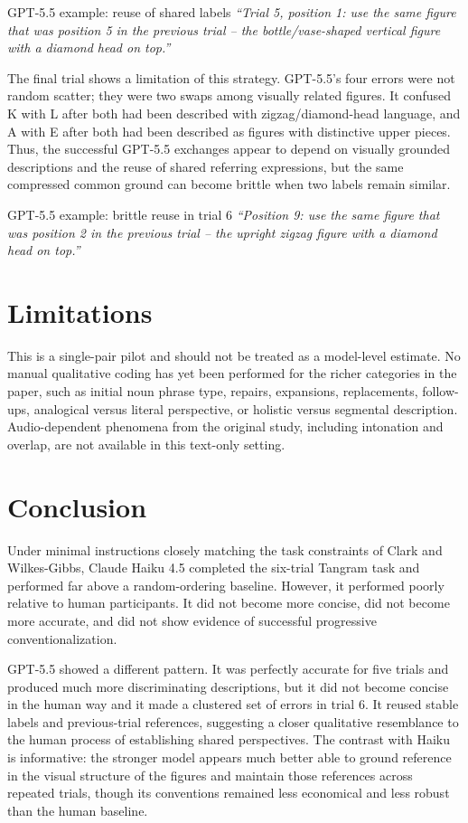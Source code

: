 \documentclass[11pt]{article}
\begin{document}
\begin{modelquote}{GPT-5.5 example: reuse of shared labels}
\emph{``Trial 5, position 1: use the same figure that was position 5 in the previous trial -- the bottle/vase-shaped vertical figure with a diamond head on top.''}
\end{modelquote}

The final trial shows a limitation of this strategy. GPT-5.5's four errors were not random scatter; they were two swaps among visually related figures. It confused K with L after both had been described with zigzag/diamond-head language, and A with E after both had been described as figures with distinctive upper pieces. Thus, the successful GPT-5.5 exchanges appear to depend on visually grounded descriptions and the reuse of shared referring expressions, but the same compressed common ground can become brittle when two labels remain similar.

\begin{modelquote}{GPT-5.5 example: brittle reuse in trial 6}
\emph{``Position 9: use the same figure that was position 2 in the previous trial -- the upright zigzag figure with a diamond head on top.''}
\end{modelquote}

\section*{Limitations}

This is a single-pair pilot and should not be treated as a model-level estimate. No manual qualitative coding has yet been performed for the richer categories in the paper, such as initial noun phrase type, repairs, expansions, replacements, follow-ups, analogical versus literal perspective, or holistic versus segmental description. Audio-dependent phenomena from the original study, including intonation and overlap, are not available in this text-only setting.

\section*{Conclusion}

Under minimal instructions closely matching the task constraints of Clark and Wilkes-Gibbs, Claude Haiku 4.5 completed the six-trial Tangram task and performed far above a random-ordering baseline. However, it performed poorly relative to human participants. It did not become more concise, did not become more accurate, and did not show evidence of successful progressive conventionalization.

GPT-5.5 showed a different pattern. It was perfectly accurate for five trials and produced much more discriminating descriptions, but it did not become concise in the human way and it made a clustered set of errors in trial 6. It reused stable labels and previous-trial references, suggesting a closer qualitative resemblance to the human process of establishing shared perspectives. The contrast with Haiku is informative: the stronger model appears much better able to ground reference in the visual structure of the figures and maintain those references across repeated trials, though its conventions remained less economical and less robust than the human baseline.
\end{document}
